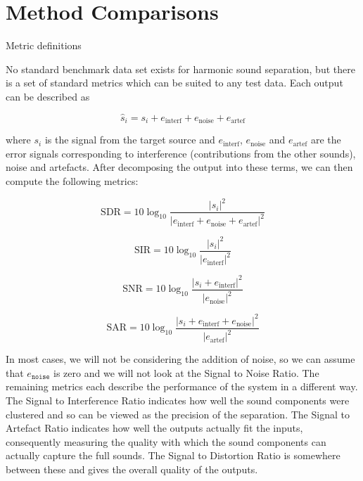 \documentclass[10pt,twoside,a4paper]{report}
\begin{document}
\section{Method Comparisons}

Metric definitions

No standard benchmark data set exists for harmonic sound separation, but there is a set of standard metrics \cite{vincent2006performance} which can be suited to any test data. Each output can be described as

\begin{equation}
\hat{s}_i = s_i + e_{\mathrm{interf}} + e_{\mathrm{noise}} + e_{\mathrm{artef}}
\end{equation}

where $ s_i $ is the signal from the target source and $ e_{\mathrm{interf}} $, $ e_{\mathrm{noise}} $ and $ e_{\mathrm{artef}} $ are the error signals corresponding to interference (contributions from the other sounds), noise and artefacts. After decomposing the output into these terms, we can then compute the following metrics:

\begin{equation}
\mathrm{SDR} = 10 \log_{10} \frac{\left| s_i \right|^2}{\left| e_{\mathrm{interf}} + e_{\mathrm{noise}} + e_{\mathrm{artef}} \right|^2}
\end{equation}

\begin{equation}
\mathrm{SIR} = 10 \log_{10} \frac{\left| s_i \right|^2}{\left| e_{\mathrm{interf}} \right|^2}
\end{equation}

\begin{equation}
\mathrm{SNR} = 10 \log_{10} \frac{\left| s_i + e_{\mathrm{interf}} \right|^2}{\left| e_{\mathrm{noise}} \right|^2}
\end{equation}

\begin{equation}
\mathrm{SAR} = 10 \log_{10} \frac{\left| s_i + e_{\mathrm{interf}} + e_{\mathrm{noise}} \right|^2}{\left| e_{\mathrm{artef}} \right|^2}
\end{equation}

In most cases, we will not be considering the addition of noise, so we can assume that $ e_{\texttt{noise}} $ is zero and we will not look at the Signal to Noise Ratio. The remaining metrics each describe the performance of the system in a different way. The Signal to Interference Ratio indicates how well the sound components were clustered and so can be viewed as the precision of the separation. The Signal to Artefact Ratio indicates how well the outputs actually fit the inputs, consequently measuring the quality with which the sound components can actually capture the full sounds. The Signal to Distortion Ratio is somewhere between these and gives the overall quality of the outputs.
\end{document}
